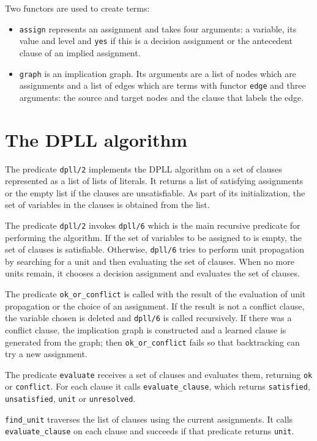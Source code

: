 \documentclass[11pt]{report}
\newcommand*{\p}[1]{\textup{\texttt{#1}}}
\begin{document}
Two functors are used to create terms:
\begin{itemize}

\item \p{assign} represents an assignment and takes four arguments: a
variable, its value and level and \p{yes} if this is a decision
assignment or the antecedent clause of an implied assignment.

\item \p{graph} is an implication graph. Its arguments are a list of
nodes which are assignments and a list of edges which are terms with
functor \p{edge} and three arguments: the source and target nodes
and the clause that labels the edge.
\end{itemize}


\section{The DPLL algorithm}

The predicate \p{dpll/2} implements the DPLL algorithm on a set of
clauses represented as a list of lists of literals. It returns a list of
satisfying assignments or the empty list if the clauses are
unsatisfiable. As part of its initialization, the set of variables in
the clauses is obtained from the list.

The predicate \p{dpll/2} invokes \p{dpll/6} which is the main recursive
predicate for performing the algorithm. If the set of variables to be
assigned to is empty, the set of clauses is satisfiable. Otherwise,
\p{dpll/6} tries to perform unit propagation by searching for a unit and
then evaluating the set of clauses. When no more units remain, it
chooses a decision assignment and evaluates the set of clauses.

The predicate \p{ok\_or\_conflict} is called with the result of the
evaluation of unit propagation or the choice of an assignment. If the
result is not a conflict clause, the variable chosen is deleted and
\p{dpll/6} is called recursively. If there was a conflict clause, the
implication graph is constructed and a learned clause is generated from
the graph; then \p{ok\_or\_conflict} fails so that backtracking can try
a new assignment.

The predicate \p{evaluate} receives a set of clauses and evaluates them,
returning \p{ok} or \p{conflict}. For each clause it calls
\p{evaluate\_clause}, which returns \p{satisfied}, \p{unsatisfied},
\p{unit} or \p{unresolved}.

\p{find\_unit} traverses the list of clauses using the current
assignments. It calls \p{evaluate\_clause} on each clause and succeeds
if that predicate returns \p{unit}.
\end{document}
